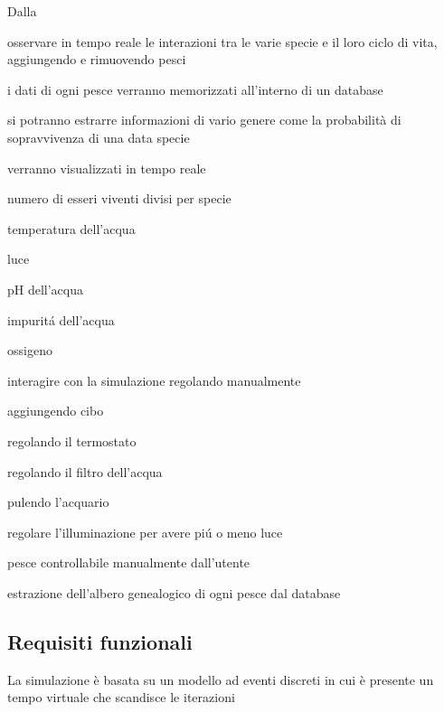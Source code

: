 \documentclass[12pt,a4paper,oneside,article]{article}
\begin{document}
	Dalla
	\begin{legal}[label*=2.\arabic*.]
    	\item osservare in tempo reale le interazioni tra le varie specie e il loro ciclo di vita, aggiungendo e rimuovendo pesci
    	\item i dati di ogni pesce verranno memorizzati all’interno di un database
    	\item si potranno estrarre informazioni di vario genere come la probabilità di sopravvivenza di una data specie
    	\item verranno visualizzati in tempo reale
    	\begin{legal}
    		\item numero di esseri viventi divisi per specie
    		\item temperatura dell’acqua
    		\item luce
    		\item pH dell’acqua
    		\item impurit\'a dell’acqua
    		\item ossigeno
    	\end{legal}
    	\item interagire con la simulazione regolando manualmente
    	\begin{legal}
    		\item aggiungendo cibo
    		\item regolando il termostato
    		\item regolando il filtro dell’acqua
    		\item pulendo l’acquario
    		\item regolare l’illuminazione per avere pi\'u o meno luce
    	\end{legal}
    	\item pesce controllabile manualmente dall’utente
    	\item estrazione dell’albero genealogico di ogni pesce dal database
    \end{legal}
    
    \subsection{Requisiti funzionali}
    \begin{legal}[label*=3.\arabic*.]
    	\item La simulazione è basata su un modello ad eventi discreti in cui è presente un tempo virtuale che scandisce le iterazioni
    \end{legal}
\end{document}
